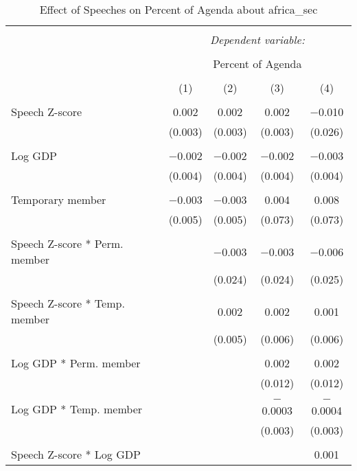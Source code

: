 
\begin{table}[!htbp] \centering 
  \caption{Effect of Speeches on Percent of Agenda about africa_sec} 
  \label{} 
\begin{tabular}{@{\extracolsep{5pt}}lcccc} 
\\[-1.8ex]\hline 
\hline \\[-1.8ex] 
 & \multicolumn{4}{c}{\textit{Dependent variable:}} \\ 
\cline{2-5} 
\\[-1.8ex] & \multicolumn{4}{c}{Percent of Agenda} \\ 
\\[-1.8ex] & (1) & (2) & (3) & (4)\\ 
\hline \\[-1.8ex] 
 Speech Z-score & 0.002 & 0.002 & 0.002 & $-$0.010 \\ 
  & (0.003) & (0.003) & (0.003) & (0.026) \\ 
  & & & & \\ 
 Log GDP & $-$0.002 & $-$0.002 & $-$0.002 & $-$0.003 \\ 
  & (0.004) & (0.004) & (0.004) & (0.004) \\ 
  & & & & \\ 
 Temporary member & $-$0.003 & $-$0.003 & 0.004 & 0.008 \\ 
  & (0.005) & (0.005) & (0.073) & (0.073) \\ 
  & & & & \\ 
 Speech Z-score * Perm. member &  & $-$0.003 & $-$0.003 & $-$0.006 \\ 
  &  & (0.024) & (0.024) & (0.025) \\ 
  & & & & \\ 
 Speech Z-score * Temp. member &  & 0.002 & 0.002 & 0.001 \\ 
  &  & (0.005) & (0.006) & (0.006) \\ 
  & & & & \\ 
 Log GDP * Perm. member &  &  & 0.002 & 0.002 \\ 
  &  &  & (0.012) & (0.012) \\ 
  & & & & \\ 
 Log GDP * Temp. member &  &  & $-$0.0003 & $-$0.0004 \\ 
  &  &  & (0.003) & (0.003) \\ 
  & & & & \\ 
 Speech Z-score * Log GDP &  &  &  & 0.001 \\ 

\end{tabular}
\end{table}
